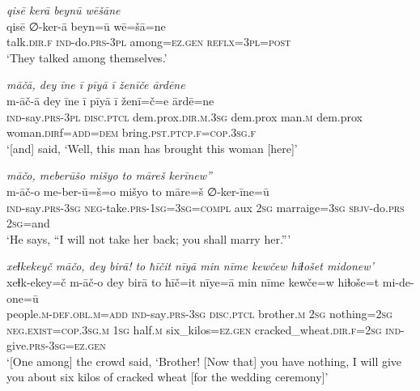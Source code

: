 \ea \label{ZP.114}
\textit{qisē kerā beynū wēšāne} \\ 
\gll qisē ∅-ker-ā beyn=ū wē=šā=ne \\ 
 talk\textsc{.dir}\textsc{.f} \textsc{ind-}do\textsc{.prs}\textsc{-3pl} among\textsc{\textsc{=ez.gen}} \textsc{reflx}\textsc{=3pl}\textsc{=\textsc{post}} \\ 
\glt `They talked among themselves.'
\z 
 
\ea \label{ZP.115}
\textit{māčā, dey īne ī pīyā ī ženīče ārdēne} \\ 
\gll m-āč-ā dey īne ī pīyā ī ženī=č=e ārdē=ne \\ 
 \textsc{ind-}say\textsc{.prs}\textsc{-3pl} \textsc{disc.ptcl} dem.prox\textsc{.dir}\textsc{.m}\textsc{.3sg} dem.prox man\textsc{.m} dem.prox woman\textsc{.dir}f\textsc{=add}\textsc{=dem} bring\textsc{.pst}\textsc{.ptcp}\textsc{.f}\textsc{=cop}\textsc{.3sg}\textsc{.f} \\ 
\glt `[and] said, ‘Well, this man has brought this woman [here]'
\z 
 
\ea \label{ZP.116}
\textit{māčo, meberūšo mišyo to māreš kerīnew”} \\ 
\gll m-āč-o me-ber-ū=š=o mišyo to māre=š ∅-ker-īne=ū \\ 
 \textsc{ind-}say\textsc{.prs}\textsc{-3sg} \textsc{neg-}take\textsc{.prs}\textsc{-\textsc{1sg}}\textsc{=3sg}\textsc{=compl} aux \textsc{2sg} marraige\textsc{=3sg} \textsc{sbjv-}do\textsc{.prs} \textsc{2sg}=and \\ 
\glt `He says, “I will not take her back; you shall marry her.”'
\z 
 
\ea \label{ZP.118}
\textit{xeɫkekeyč māčo, dey birā! to ħīčit nīyā min nīme kewčew hiɫošet midonew’} \\ 
\gll xeɫk-ekey=č m-āč-o dey birā to ħīč=it nīye=ā min nīme kewče=w hiɫoše=t mi-de-one=ū \\ 
 people\textsc{.m}\textsc{-def}\textsc{.obl}\textsc{.m}\textsc{=add} \textsc{ind-}say\textsc{.prs}\textsc{-3sg} \textsc{disc.ptcl} brother\textsc{.m} \textsc{2sg} nothing\textsc{=\textsc{2sg}} \textsc{\textsc{neg.}exist}\textsc{=cop}\textsc{.3sg}\textsc{.m} \textsc{1sg} half\textsc{.m} six\_kilos\textsc{\textsc{=ez.gen}} cracked\_wheat\textsc{.dir}\textsc{.f}\textsc{=\textsc{2sg}} \textsc{ind-}give\textsc{.prs}\textsc{-3sg}\textsc{\textsc{=ez.gen}} \\ 
\glt `[One among] the crowd said, ‘Brother! [Now that] you have nothing, I will give you about six kilos of cracked wheat [for the wedding ceremony]'
\z 
 
